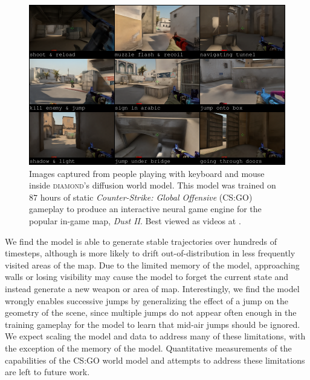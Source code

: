 \begin{figure}[h]
\begin{center}
\includegraphics[width=.7\linewidth]{images/csgo_grid.png}
\caption{Images captured from people playing with keyboard and mouse inside \textsc{diamond}'s diffusion world model. This model was trained on $87$ hours of static \textit{Counter-Strike: Global Offensive} (CS:GO) gameplay \citep{pearce2022counter} to produce an interactive neural game engine for the popular in-game map, \textit{Dust II}. Best viewed as videos at \wslink.}
\label{fig:csgo_grid}
\end{center}
\vspace{-4mm}
\end{figure}

We find the model is able to generate stable trajectories over hundreds of timesteps, although is more likely to drift out-of-distribution in less frequently visited areas of the map. Due to the limited memory of the model, approaching walls or losing visibility may cause the model to forget the current state and instead generate a new weapon or area of map. Interestingly, we find the model wrongly enables successive jumps by generalizing the effect of a jump on the geometry of the scene, since multiple jumps do not appear often enough in the training gameplay for the model to learn that mid-air jumps should be ignored. We expect scaling the model and data to address many of these limitations, with the exception of the memory of the model. Quantitative measurements of the capabilities of the CS:GO world model and attempts to address these limitations are left to future work.




